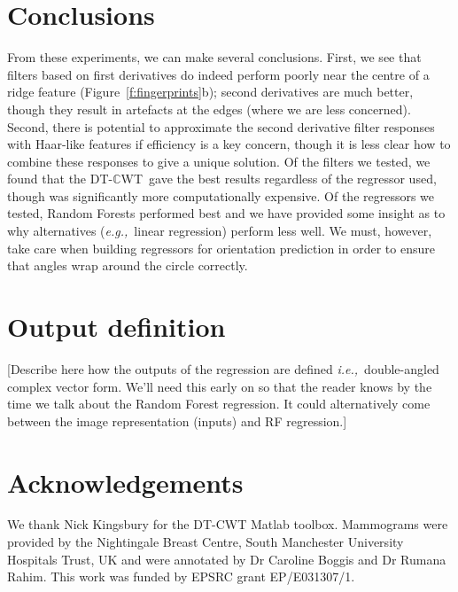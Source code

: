 \documentclass{report}
\def\eg{\emph{e.g.,}}
\def\ie{\emph{i.e.,}}
\newcommand{\fref}[1]{Figure~\ref{#1}}
\def\dtcwt{DT-$\mathbb{C}$WT}
\begin{document}
\section{Conclusions}
From these experiments, we can make several conclusions. First, we see that filters based on first derivatives do indeed perform poorly near the centre of a ridge feature (\fref{f:fingerprints}b); second derivatives are much better, though they result in artefacts at the edges (where we are less concerned). Second, there is potential to approximate the second derivative filter responses with Haar-like features if efficiency is a key concern, though it is less clear how to combine these responses to give a unique solution. Of the filters we tested, we found that the \dtcwt~gave the best results regardless of the regressor used, though was significantly more computationally expensive. Of the regressors we tested, Random Forests performed best and we have provided some insight as to why alternatives (\eg~linear regression) perform less well. We must, however, take care when building regressors for orientation prediction in order to ensure that angles wrap around the circle correctly.


\section{Output definition}
[Describe here how the outputs of the regression are defined \ie~double-angled complex vector form. We'll need this early on so that the reader knows by the time we talk about the Random Forest regression. It could alternatively come between the image representation (inputs) and RF regression.]



%
%
%




\section*{Acknowledgements}
We thank Nick Kingsbury for the DT-CWT Matlab toolbox. Mammograms were provided by the Nightingale Breast Centre, South Manchester University Hospitals Trust, UK and were annotated by Dr Caroline Boggis and Dr Rumana Rahim. This work was funded by EPSRC grant EP/E031307/1.



\end{document}
